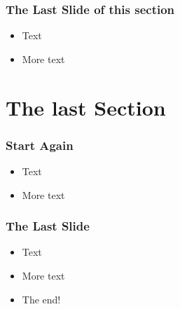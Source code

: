\documentclass{beamer}
\begin{document}
\begin{frame} 
\frametitle{The Last Slide of this section}
\begin{itemize}
 \item Text
 \item More text
\end{itemize}
\end{frame}

\section{The last Section}
\begin{frame} 
\frametitle{Start Again}
\begin{itemize}
 \item Text
 \item More text
\end{itemize}
\end{frame}

\begin{frame} 
\frametitle{The Last Slide}
\begin{itemize}
 \item Text
 \item More text
 \item The end!
\end{itemize}
\end{frame}
\end{document}
